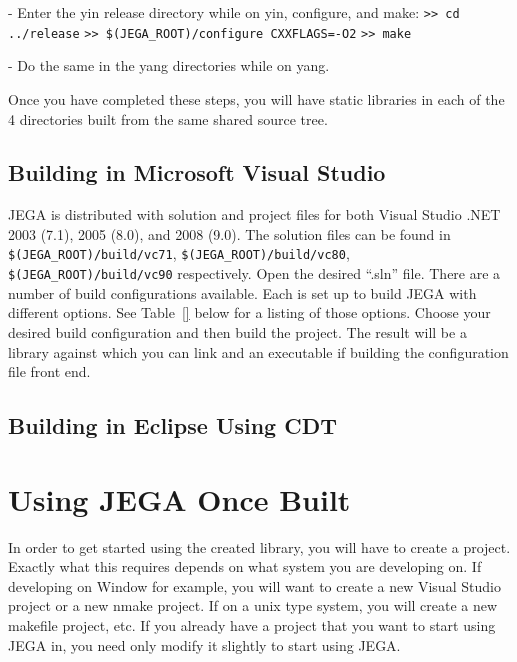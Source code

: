 - Enter the yin release directory while on yin, configure, and make:\newline
    \texttt{>> cd ../release}\newline
    \texttt{>> \$(JEGA\_ROOT)/configure CXXFLAGS=-O2}\newline
    \texttt{>> make}\newline

- Do the same in the yang directories while on yang.\newline

Once you have completed these steps, you will have static libraries
in each of the 4 directories built from the same shared source tree.

\subsection{Building in Microsoft Visual Studio}\label{sec:building_msvs}

JEGA is distributed with solution and project files for both Visual
Studio .NET 2003 (7.1), 2005 (8.0), and 2008 (9.0).  The solution files
can be found in \texttt{\$(JEGA\_ROOT)/build/vc71},
\texttt{\$(JEGA\_ROOT)/build/vc80}, \texttt{\$(JEGA\_ROOT)/build/vc90}
respectively.  Open the desired ``.sln'' file.  There are a number of
build configurations available.  Each is set up to build JEGA with
different options. See Table~\ref{} below for a listing of those options.
Choose your desired build configuration and then build the project.  The
result will be a library against which you can link and an executable if
building the configuration file front end.

\subsection{Building in Eclipse Using CDT}\label{sec:building_eclipse_cdt}



\section{Using JEGA Once Built}\label{sec:using_built_JEGA}

In order to get started using the created library, you will have to
create a project. Exactly what this requires depends on what system
you are developing on.  If developing on Window for example, you
will want to create a new Visual Studio project or a new nmake
project. If on a unix type system, you will create a new makefile
project, etc.  If you already have a project that you want to start
using JEGA in, you need only modify it slightly to start using JEGA.

